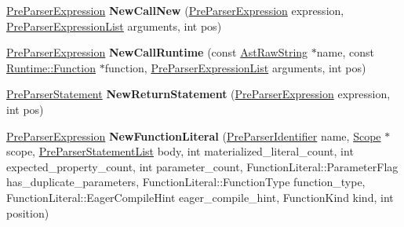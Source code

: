 \begin{DoxyCompactItemize}
\item 
\hyperlink{classv8_1_1internal_1_1_pre_parser_expression}{Pre\+Parser\+Expression} {\bfseries New\+Call\+New} (\hyperlink{classv8_1_1internal_1_1_pre_parser_expression}{Pre\+Parser\+Expression} expression, \hyperlink{classv8_1_1internal_1_1_pre_parser_list}{Pre\+Parser\+Expression\+List} arguments, int pos)\hypertarget{classv8_1_1internal_1_1_pre_parser_factory_a37f894157d7462dc016411e449766904}{}\label{classv8_1_1internal_1_1_pre_parser_factory_a37f894157d7462dc016411e449766904}

\item 
\hyperlink{classv8_1_1internal_1_1_pre_parser_expression}{Pre\+Parser\+Expression} {\bfseries New\+Call\+Runtime} (const \hyperlink{classv8_1_1internal_1_1_ast_raw_string}{Ast\+Raw\+String} $\ast$name, const \hyperlink{structv8_1_1internal_1_1_runtime_1_1_function}{Runtime\+::\+Function} $\ast$function, \hyperlink{classv8_1_1internal_1_1_pre_parser_list}{Pre\+Parser\+Expression\+List} arguments, int pos)\hypertarget{classv8_1_1internal_1_1_pre_parser_factory_a2a0d6aae282b4da9f17928d2a64ce8d7}{}\label{classv8_1_1internal_1_1_pre_parser_factory_a2a0d6aae282b4da9f17928d2a64ce8d7}

\item 
\hyperlink{classv8_1_1internal_1_1_pre_parser_statement}{Pre\+Parser\+Statement} {\bfseries New\+Return\+Statement} (\hyperlink{classv8_1_1internal_1_1_pre_parser_expression}{Pre\+Parser\+Expression} expression, int pos)\hypertarget{classv8_1_1internal_1_1_pre_parser_factory_a29d43aa30fcd3b3b4d0092c040dd266e}{}\label{classv8_1_1internal_1_1_pre_parser_factory_a29d43aa30fcd3b3b4d0092c040dd266e}

\item 
\hyperlink{classv8_1_1internal_1_1_pre_parser_expression}{Pre\+Parser\+Expression} {\bfseries New\+Function\+Literal} (\hyperlink{classv8_1_1internal_1_1_pre_parser_identifier}{Pre\+Parser\+Identifier} name, \hyperlink{classv8_1_1internal_1_1_scope}{Scope} $\ast$scope, \hyperlink{classv8_1_1internal_1_1_pre_parser_list}{Pre\+Parser\+Statement\+List} body, int materialized\+\_\+literal\+\_\+count, int expected\+\_\+property\+\_\+count, int parameter\+\_\+count, Function\+Literal\+::\+Parameter\+Flag has\+\_\+duplicate\+\_\+parameters, Function\+Literal\+::\+Function\+Type function\+\_\+type, Function\+Literal\+::\+Eager\+Compile\+Hint eager\+\_\+compile\+\_\+hint, Function\+Kind kind, int position)\hypertarget{classv8_1_1internal_1_1_pre_parser_factory_a848f99a92b5080a3724bfc3fb7fe7d3b}{}\label{classv8_1_1internal_1_1_pre_parser_factory_a848f99a92b5080a3724bfc3fb7fe7d3b}


\end{DoxyCompactItemize}
